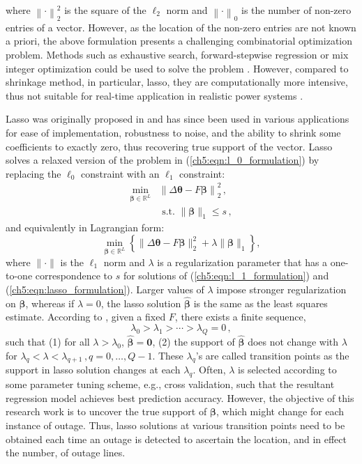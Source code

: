 where $\left\|\cdot\right\|^2_2$ is the square of the $\ell_2$ norm and $\left\|\cdot\right\|_0$ is the number of non-zero entries of a vector. However, as the location of the non-zero entries are not known a priori, the above formulation presents a challenging combinatorial optimization problem. Methods such as exhaustive search, forward-stepwise regression or mix integer optimization could be used to solve the problem \cite{bertsimas2020sparse}. However, compared to shrinkage method, in particular, lasso, they are computationally more intensive, thus not suitable for real-time application in realistic power systems \cite{hastie2020best}. 

Lasso was originally proposed in \cite{tibshirani1996regression} and has since been used in various applications for ease of implementation, robustness to noise, and the ability to shrink some coefficients to exactly zero, thus recovering true support of the vector. Lasso solves a relaxed version of the problem in (\ref{ch5:eqn:l_0_formulation}) by replacing the $\ell_0$ constraint with an $\ell_1$ constraint:
\begin{align}
\label{ch5:eqn:l_1_formulation}
\underset{\boldsymbol{\beta}  \in \mathbb{R}^{L} }{\min} &\left\|\Delta\boldsymbol{\theta} - F\boldsymbol{\beta}\right\|_{2}^{2} \,, \\
& \text { s.t. }\|\boldsymbol{\beta}\|_{1} \le s \nonumber\,,
\end{align}
and equivalently in Lagrangian form:
\begin{equation}
\label{ch5:eqn:lasso_formulation}
\min_{\boldsymbol{\beta} \in \mathbb{R}^{L}}\left\{\|\Delta\boldsymbol{\theta} - F\boldsymbol{\beta}\|_{2}^{2}+\lambda\|\boldsymbol{\beta}\|_{1}\right\},
\end{equation}
where $\|\cdot\|$ is the $\ell_1$ norm and $\lambda$ is a regularization parameter that has a one-to-one correspondence to $s$ for solutions of (\ref{ch5:eqn:l_1_formulation}) and (\ref{ch5:eqn:lasso_formulation}). Larger values of $\lambda$ impose stronger regularization on $\boldsymbol{\beta}$, whereas if $\lambda = 0$, the lasso solution $\boldsymbol{\hat{\beta}}$ is the same as the least squares estimate. According to \cite{zou2007degrees}, given a fixed $F$, there exists a finite sequence,
\begin{equation}
\label{ch5:eqn:transition_points}
\lambda_0 > \lambda_1 > \cdots > \lambda_Q = 0 \,,
\end{equation}
such that (1) for all $\lambda > \lambda_0$, $\boldsymbol{\hat{\beta}} = \mathbf{0}$, (2) the support of $\boldsymbol{\hat{\beta}}$ does not change with $\lambda$ for $\lambda_q < \lambda < \lambda_{q+1}\,, q=0, \dots, Q-1$. These $\lambda_q$'s are called transition points as the support in lasso solution changes at each $\lambda_q$. Often, $\lambda$ is selected according to some parameter tuning scheme, e.g., cross validation, such that the resultant regression model achieves best prediction accuracy. However, the objective of this research work is to uncover the true support of $\boldsymbol{\beta}$, which might change for each instance of outage. Thus, lasso solutions at various transition points need to be obtained each time an outage is detected to ascertain the location, and in effect the number, of outage lines. 

